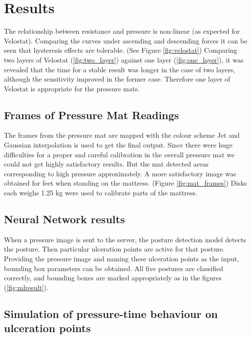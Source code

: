 \chapter{Results}
\label{chapter:results}


The relationship between resistance and pressure is non-linear (as expected for Velostat). Comparing the curves under ascending and descending forces it can be seen that hysteresis effects are tolerable. (See Figure \ref{fig:velostat}) Comparing two layers of Velostat (\ref{fig:two_layer}) against one layer (\ref{fig:one_layer}), it was revealed that the time for a stable result was longer in the case of two layers, although the sensitivity improved in the former case. Therefore one layer of Velostat is appropriate for the pressure mats. 

\section{Frames of Pressure Mat Readings}
The frames from the pressure mat are mapped with the colour scheme Jet and Gaussian interpolation is used to get the final output. Since there were huge difficulties for a proper and careful calibration in the overall pressure mat we could not get highly satisfactory results. But the mat detected areas corresponding to high pressure approximately. A more satisfactory image was obtained for feet when standing on the mattress. (Figure \ref{fig:mat_frames}) Disks each weighs 1.25 kg were used to calibrate parts of the mattress. 

\section{Neural Network results}
When a pressure image is sent to the server, the posture detection model detects the posture. Then particular ulceration points are active for that posture. Providing the pressure image and naming these ulceration points as the input, bounding box parameters can be obtained.
All five postures are classified correctly, and bounding boxes are marked appropriately as in the figures (\ref{fig:mlresult}).

\section{Simulation of pressure-time behaviour on ulceration points}

